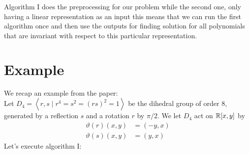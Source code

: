 \documentclass[]{article}
\begin{document}
Algorithm I does the preprocessing for our problem while the second one, only having a linear representation as an input
this means that we can run the first algorithm once and then 
use the outputs for finding solution for 
all polynomials that are invariant with respect to this particular representation.


\section*{Example}
We recap an example from the paper:\\
Let $D_4=\left<r,s\mid r^4=s^2=(rs)^2=1\right>$ be the dihedral group of order $8$, generated by a reflection $s$ and a rotation $r$ by $\pi/2$. We let $D_4$ act on $\mathbb R[x,y]$ by 
\begin{align*}
    \vartheta(r)(x,y)&=(-y,x)\\
    \vartheta(s)(x,y)&=(y,x)
\end{align*}
Let's execute algorithm I:
\end{document}
